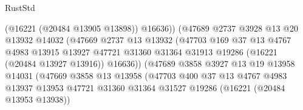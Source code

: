 \begin{lexlean}{RustStd}
\begin{coremodule}
                                        (@16221 (@20484 @13905 @13898))
                                        @16636))
                                    (@47689
                                      @2737
                                      @3928
                                      @13
                                      @20
                                      @13932
                                      @14032
                                      (@47669
                                        @2737
                                        @13
                                        @13932
                                        (@47703
                                          @169
                                          @37
                                          @13
                                          @4767
                                          @4983
                                          @13915
                                          @13927
                                          @47721
                                          @31360
                                          @31364
                                          @31913
                                          @19286
                                          (@16221 (@20484 @13927 @13916))
                                          @16636))
                                      (@47689
                                        @3858
                                        @3927
                                        @13
                                        @19
                                        @13958
                                        @14031
                                        (@47669
                                          @3858
                                          @13
                                          @13958
                                          (@47703
                                            @400
                                            @37
                                            @13
                                            @4767
                                            @4983
                                            @13937
                                            @13953
                                            @47721
                                            @31360
                                            @31364
                                            @31527
                                            @19286
                                            (@16221 (@20484 @13953 @13938))

\end{coremodule}
\end{lexlean}

